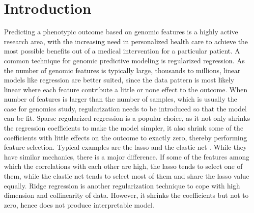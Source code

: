 \documentclass[12pt]{article}
\begin{document}
\noindent%



\section{Introduction}
\label{sec:intro}
Predicting a phenotypic outcome based on genomic features is a highly active research area, with the increasing need in personalized health care to achieve the most possible benefits out of a medical intervention for a particular patient. A common technique for genomic predictive modeling is regularized regression. As the number of genomic features is typically large, thousands to millions, linear models like regression are better suited, since the data pattern is most likely linear where each feature contribute a little or none effect to the outcome. When number of features is larger than the number of samples, which is usually the case for genomics study, regularization needs to be introduced so that the model can be fit. Sparse regularized regression is a popular choice, as it not only shrinks the regression coefficients to make the model simpler, it also shrink some of the coefficients with little effects on the outcome to exactly zero, thereby performing feature selection. Typical examples are the lasso \citep{tibshirani1996regression} and the elastic net \citep{zou2005regularization}. While they have similar mechanics, there is a major difference. If some of the features among which the correlations with each other are high, the lasso tends to select one of them, while the elastic net tends to select most of them and share the lasso value equally. Ridge regression \citep{hoerl1970ridge} is another regularization technique to cope with high dimension and collinearity of data. However, it shrinks the coefficients but not to zero, hence does not produce interpretable model. 
\end{document}
